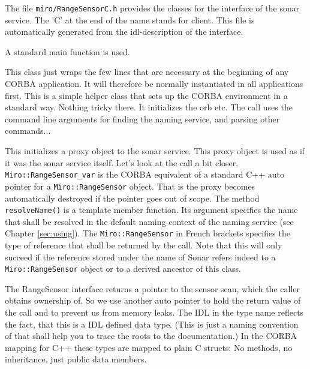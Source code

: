 The file \lstinline!miro/RangeSensorC.h! provides the classes for the interface of the
sonar service. The 'C' at the end of the name stands for client. This
file is automatically generated from the idl-description of the interface.



A standard main function is used.



This class just wraps the few lines that are necessary at the beginning of any CORBA
application. It will therefore be normally instantiated in all \miro
applications first. This is a simple helper class that sets up the
CORBA environment in a standard way. Nothing tricky there.  It
initializes the orb etc. The call uses the command line arguments for
finding the naming service, and parsing other commands...



This initializes a proxy object to the sonar service. This proxy
object is used as if it was the sonar service itself. Let's look
at the call a bit closer. \lstinline!Miro::RangeSensor_var! is the
CORBA equivalent of a standard C++ auto pointer for a
\lstinline!Miro::RangeSensor! object. That is the proxy becomes
automatically destroyed if the pointer goes out of scope. The
method {\tt resolveName()} is a template member function. Its
argument specifies the name that shall be resolved in the default
naming context of the naming service (see Chapter
\ref{sec:using}). The \lstinline!Miro::RangeSensor! in French
brackets specifies the type of reference that shall be returned by
the call. Note that this will only succeed if the reference stored
under the name of Sonar refers indeed to a {\tt Miro::RangeSensor}
object or to a derived ancestor of this class.



The RangeSensor interface returns a pointer to the sensor scan, which
the caller obtains ownership of. So we use another auto pointer to
hold the return value of the call and to prevent us from memory leaks.
The IDL in the type name reflects the fact, that this is a IDL defined
data type. (This is just a naming convention of \miro that shall help
you to trace the roots to the documentation.) In the CORBA mapping for
C++ these types are mapped to plain C structs: No methods, no
inheritance, just public data members.

